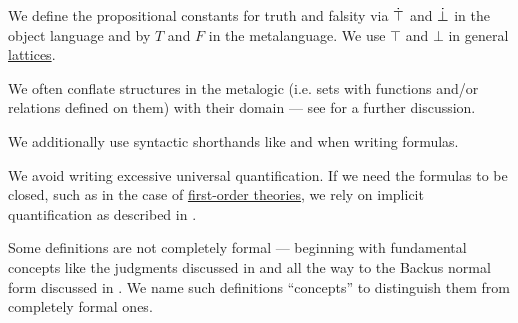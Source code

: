 \begin{remark}
\begin{thmenum}
     We define the propositional constants for truth and falsity via \( \dot{\top} \) and \( \dot{\bot} \) in the object language and by \( T \) and \( F \) in the metalanguage. We use \( \top \) and \( \bot \) in general \hyperref[def:lattice]{lattices}.

     We often conflate structures in the metalogic (i.e. sets with functions and/or relations defined on them) with their domain --- see  for a further discussion.

     We additionally use syntactic shorthands like  and  when writing formulas.

     We avoid writing excessive universal quantification. If we need the formulas to be closed, such as in the case of \hyperref[def:first_order_theory]{first-order theories}, we rely on implicit quantification as described in .

     Some definitions are not completely formal --- beginning with fundamental concepts like the judgments discussed in  and all the way to the Backus normal form discussed in . We name such definitions \enquote{concepts} to distinguish them from completely formal ones.
  \end{thmenum}
\end{remark}
